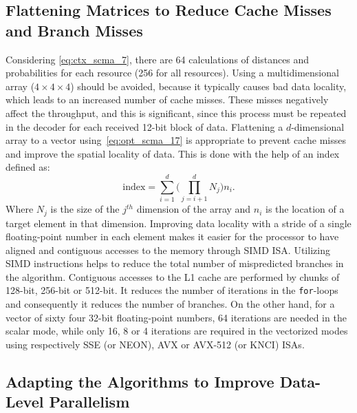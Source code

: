 \subsection{Flattening Matrices to Reduce Cache Misses and Branch Misses}
\label{sec:opt_scma_flattening}

Considering \eqref{eq:ctx_scma_7}, there are 64 calculations of distances and
probabilities for each resource (256 for all resources). Using a
multidimensional array ($4\times4\times4$) should be avoided, because it
typically causes bad data locality, which leads to an increased number of cache
misses. These misses negatively affect the throughput, and this is significant,
since this process must be repeated in the decoder for each received 12-bit
block of data. Flattening a $d$-dimensional array to a vector
using~\eqref{eq:opt_scma_17} is appropriate to prevent cache misses and improve
the spatial locality of data. This is done with the help of an index defined as:
\begin{equation}
  \label{eq:opt_scma_17}
  \text{index} = \sum\limits_{i=1}^d\Bigg( \prod\limits_{j=i+1}^d N_j \Bigg)n_i.
\end{equation}
Where $N_j$ is the size of the $j^{th}$ dimension of the array and $n_i$ is the
location of a target element in that dimension. Improving data locality with
a stride of a single floating-point number in each element makes it easier for
the processor to have aligned and contiguous accesses to the memory through SIMD
ISA. Utilizing SIMD instructions helps to reduce the total number of
mispredicted branches in the algorithm. Contiguous accesses to the L1 cache are
performed by chunks of 128-bit, 256-bit or 512-bit. It reduces the number of
iterations in the \verb|for|-loops and consequently it reduces the number of
branches. On the other hand, for a vector of sixty four 32-bit floating-point
numbers, 64 iterations are needed in the scalar mode, while only 16, 8 or 4
iterations are required in the vectorized modes using respectively SSE (or
NEON), AVX or AVX-512 (or KNCI) ISAs.

\subsection{Adapting the Algorithms to Improve Data-Level Parallelism}
\label{sec:opt_scma_adapting_algorithms}

